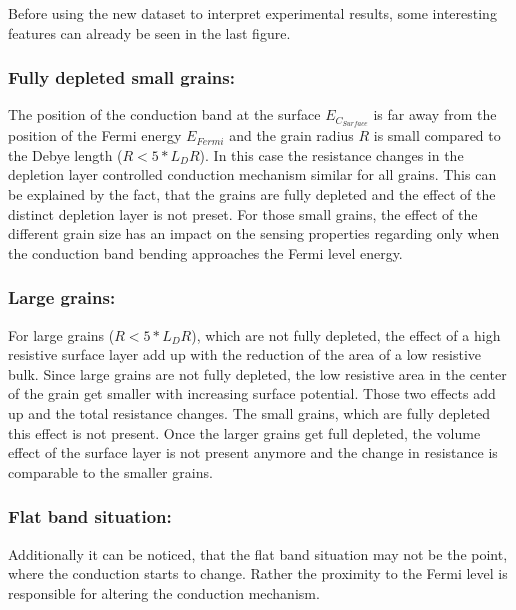 \documentclass[11pt]{article}
\begin{document}
Before using the new dataset to interpret experimental results, some
interesting features can already be seen in the last figure.

\hypertarget{fully-depleted-small-grains}{%
\subsubsection{Fully depleted small
grains:}\label{fully-depleted-small-grains}}

The position of the conduction band at the surface \(E_{C_{Surface}}\)
is far away from the position of the Fermi energy \(E_{Fermi}\) and the
grain radius \(R\) is small compared to the Debye length (\(R<5*L_DR\)).
In this case the resistance changes in the depletion layer controlled
conduction mechanism similar for all grains. This can be explained by
the fact, that the grains are fully depleted and the effect of the
distinct depletion layer is not preset. For those small grains, the
effect of the different grain size has an impact on the sensing
properties regarding only when the conduction band bending approaches
the Fermi level energy.

\hypertarget{large-grains}{%
\subsubsection{Large grains:}\label{large-grains}}

For large grains (\(R<5*L_DR\)), which are not fully depleted, the
effect of a high resistive surface layer add up with the reduction of
the area of a low resistive bulk. Since large grains are not fully
depleted, the low resistive area in the center of the grain get smaller
with increasing surface potential. Those two effects add up and the
total resistance changes. The small grains, which are fully depleted
this effect is not present. Once the larger grains get full depleted,
the volume effect of the surface layer is not present anymore and the
change in resistance is comparable to the smaller grains.

\hypertarget{flat-band-situation}{%
\subsubsection{Flat band situation:}\label{flat-band-situation}}

Additionally it can be noticed, that the flat band situation may not be
the point, where the conduction starts to change. Rather the proximity
to the Fermi level is responsible for altering the conduction mechanism.
\end{document}

